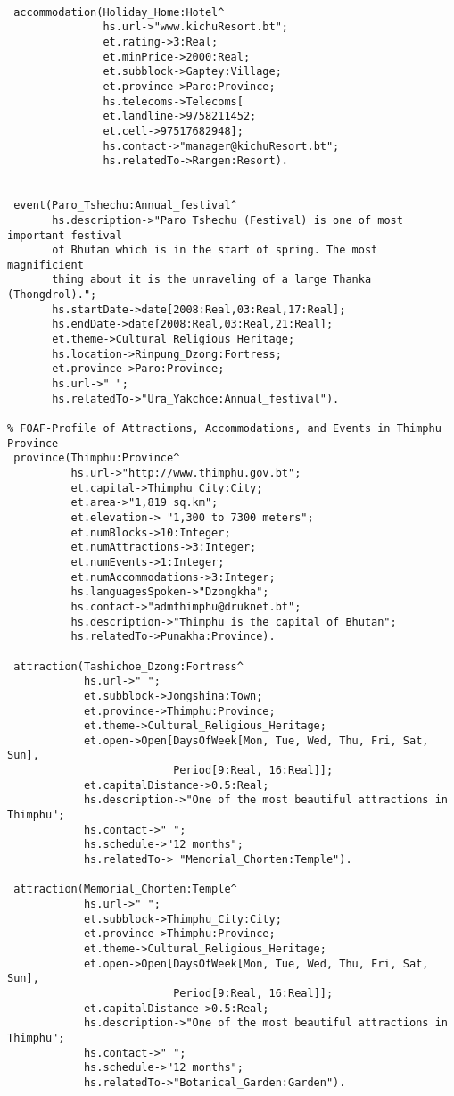 \begin{verbatim}
          
 accommodation(Holiday_Home:Hotel^
               hs.url->"www.kichuResort.bt";
               et.rating->3:Real;
               et.minPrice->2000:Real;
               et.subblock->Gaptey:Village;
               et.province->Paro:Province;
               hs.telecoms->Telecoms[
               et.landline->9758211452;
               et.cell->97517682948];
               hs.contact->"manager@kichuResort.bt";
               hs.relatedTo->Rangen:Resort).
              
    
 event(Paro_Tshechu:Annual_festival^
       hs.description->"Paro Tshechu (Festival) is one of most important festival
       of Bhutan which is in the start of spring. The most magnificient
       thing about it is the unraveling of a large Thanka (Thongdrol).";
       hs.startDate->date[2008:Real,03:Real,17:Real];
       hs.endDate->date[2008:Real,03:Real,21:Real];
       et.theme->Cultural_Religious_Heritage;
       hs.location->Rinpung_Dzong:Fortress;
       et.province->Paro:Province;
       hs.url->" ";
       hs.relatedTo->"Ura_Yakchoe:Annual_festival").   

% FOAF-Profile of Attractions, Accommodations, and Events in Thimphu Province
 province(Thimphu:Province^
          hs.url->"http://www.thimphu.gov.bt";
          et.capital->Thimphu_City:City;
          et.area->"1,819 sq.km";
          et.elevation-> "1,300 to 7300 meters";
          et.numBlocks->10:Integer;
          et.numAttractions->3:Integer;
          et.numEvents->1:Integer;
          et.numAccommodations->3:Integer;
          hs.languagesSpoken->"Dzongkha";
          hs.contact->"admthimphu@druknet.bt";
          hs.description->"Thimphu is the capital of Bhutan";
          hs.relatedTo->Punakha:Province).
 
 attraction(Tashichoe_Dzong:Fortress^
            hs.url->" ";
            et.subblock->Jongshina:Town;
            et.province->Thimphu:Province;
            et.theme->Cultural_Religious_Heritage;
            et.open->Open[DaysOfWeek[Mon, Tue, Wed, Thu, Fri, Sat, Sun],
                          Period[9:Real, 16:Real]];
            et.capitalDistance->0.5:Real;
            hs.description->"One of the most beautiful attractions in Thimphu";
            hs.contact->" ";
            hs.schedule->"12 months";
            hs.relatedTo-> "Memorial_Chorten:Temple").

 attraction(Memorial_Chorten:Temple^
            hs.url->" ";
            et.subblock->Thimphu_City:City;
            et.province->Thimphu:Province;
            et.theme->Cultural_Religious_Heritage;
            et.open->Open[DaysOfWeek[Mon, Tue, Wed, Thu, Fri, Sat, Sun],
                          Period[9:Real, 16:Real]];
            et.capitalDistance->0.5:Real;
            hs.description->"One of the most beautiful attractions in Thimphu";
            hs.contact->" ";
            hs.schedule->"12 months";
            hs.relatedTo->"Botanical_Garden:Garden").
                          


\end{verbatim}
